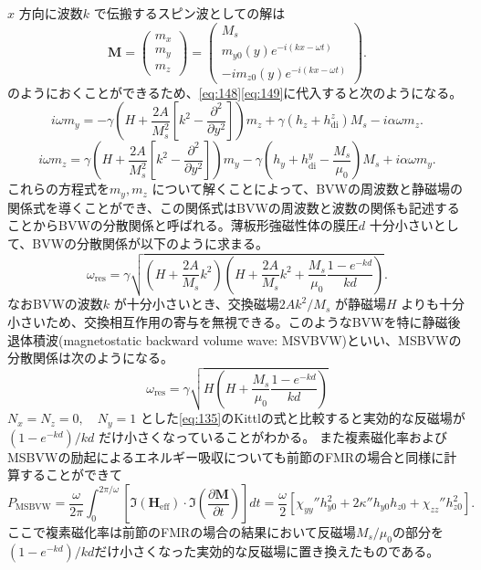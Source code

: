 \documentclass[dvipdfmx]{jsreport}
\numberwithin{equation}{chapter}
\numberwithin{table}{chapter}
\begin{document}
$x$ 方向に波数$k$ で伝搬するスピン波としての解は
\begin{equation}
\label{eq:150}
	\bm{M}=\begin{pmatrix} m_x\\m_y\\m_z \end{pmatrix} =\begin{pmatrix} M_s\\m_{y 0}(y)e^{-i(kx-\omega t)}\\ -im_{z 0 }(y)e^{-i(kx-\omega t)} \end{pmatrix} 
.\end{equation}
のようにおくことができるため、\eqref{eq:148}\eqref{eq:149}に代入すると次のようになる\cite{ku}。
\begin{equation}
\label{eq:151}
	i\omega m_y=-\gamma \left( H+\frac{2A}{M_s^2}\left[ k^2-\frac{\partial ^2}{\partial y^2}  \right]  \right) m_z+\gamma(h_z+h^{z}_\text{di} )M_s-i\alpha\omega m_z
.\end{equation}
\begin{equation}
\label{eq:152}
	i\omega m_z=\gamma\left( H+\frac{2A}{M_s^2}\left[ k^2-\frac{\partial ^2}{\partial y^2}  \right]  \right) m_y-\gamma\left( h_y+h^{y}_\text{di} -\frac{M_s}{\mu_0} \right) M_s+i\alpha\omega m_y
.\end{equation}
これらの方程式を$m_y,m_z$ について解くことによって、BVWの周波数と静磁場の関係式を導くことができ、この関係式はBVWの周波数と波数の関係も記述することからBVWの分散関係と呼ばれる。薄板形強磁性体の膜圧$d$ 十分小さいとして、BVWの分散関係が以下のように求まる\cite{ku}。
\begin{equation}
\label{eq:153}
	\omega_\text{res} =\gamma \sqrt{\left( H+\frac{2A}{M_s}k^2 \right) \left( H+\frac{2A}{M_s}k^2+\frac{M_s}{\mu_0}\frac{1-e^{-kd}}{kd} \right) } 
.\end{equation}
なおBVWの波数$k$ が十分小さいとき、交換磁場$2Ak^2 /M_s$ が静磁場$H$ よりも十分小さいため、交換相互作用の寄与を無視できる。このようなBVWを特に静磁後退体積波(magnetostatic backward volume wave: MSVBVW)といい、MSBVWの分散関係は次のようになる。
\begin{equation}
\label{eq:154}
	\omega_\text{res} =\gamma \sqrt{H\left( H+\frac{M_s}{\mu_0}\frac{1-e^{-kd}}{kd} \right) } 
\end{equation}
$N_x=N_z=0,\quad N_y=1$ とした\eqref{eq:135}のKittlの式と比較すると実効的な反磁場が$(1-e^{-kd })/kd$ だけ小さくなっていることがわかる。
また複素磁化率およびMSBVWの励起によるエネルギー吸収についても前節のFMRの場合と同様に計算することができて\cite{ku}
\begin{equation}
\label{eq:155}
	P_\text{MSBVW} =\frac{\omega}{2\pi }\int_{0}^{2\pi /\omega} \left[ \Im(\bm{H}_\text{eff} )\cdot \Im\left( \frac{\partial \bm{M}}{\partial t}  \right)  \right]  dt=\frac{\omega}{2}\left[ \chi_{yy}'' h^2_{y0}+2\kappa'' h_{y 0}h_{z 0}+\chi_{zz}'' h^2_{z 0} \right] 
.\end{equation}
ここで複素磁化率は前節のFMRの場合の結果において反磁場$M_s /\mu_0$の部分を$(1-e^{-kd}) /kd$だけ小さくなった実効的な反磁場に置き換えたものである。
\end{document}
